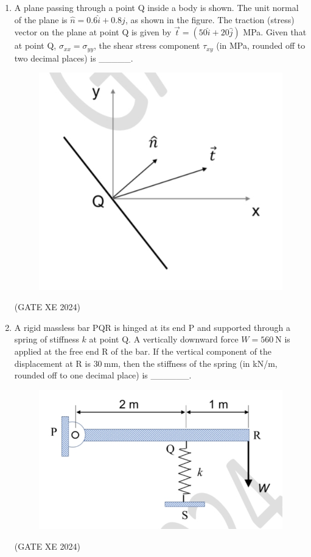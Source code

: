 \documentclass[12pt]{article}
\begin{document}
\begin{enumerate}
(GATE XE 2024)

\item A plane passing through a point Q inside a body is shown. The unit normal of the plane is $\hat{n} = 0.6 \hat{i} + 0.8 \hat{j}$, as shown in the figure. The traction (stress) vector on the plane at point Q is given by $\vec{t} = (50 \hat{i} + 20 \hat{j})$ MPa. Given that at point Q, $\sigma_{xx} = \sigma_{yy}$, the shear stress component $\tau_{xy}$ (in MPa, rounded off to two decimal places) is \_\_\_\_\_.

\begin{figure}[H]
    \centering
    \includegraphics[width=0.5\columnwidth]{figs/ass5_d_q80.jpg}
    \caption{}
    \label{fig:placeholder}
\end{figure}

(GATE XE 2024)

\item A rigid massless bar PQR is hinged at its end P and supported through a spring of stiffness $k$ at point Q. A vertically downward force $W=560\ \text{N}$ is applied at the free end R of the bar. If the vertical component of the displacement at R is $30\ \text{mm}$, then the stiffness of the spring (in kN/m, rounded off to one decimal place) is \_\_\_\_\_\_.

\begin{figure}[H]
    \centering
    \includegraphics[width=0.5\columnwidth]{figs/ass5_d_q81.jpg}
    \caption{}
    \label{fig:placeholder}
\end{figure}

(GATE XE 2024)


\end{enumerate}
\end{document}
